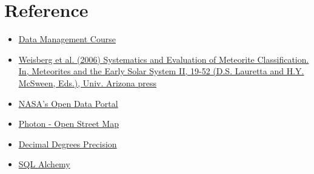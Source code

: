 \documentclass[conference]{IEEEtran}
\begin{document}
	\section{Reference}
	\begin{itemize}
		\item \href{https://www.diag.uniroma1.it/~lenzerin/index.html/?q=node/53}{Data Management Course}
		\item \href{https://web.pdx.edu/~ruzickaa/meteorites/papers/WeisbergEtal2006-classification.pdf}{Weisberg et al. (2006) Systematics and Evaluation of Meteorite Classification. In, Meteorites and the Early Solar System II, 19-52 (D.S. Lauretta and H.Y. McSween, Eds.), Univ. Arizona press}
		\item \href{https://data.nasa.gov/Space-Science/Meteorite-Landings/gh4g-9sfh/about_data}{NASA's Open Data Portal}
		\item \href{https://photon.komoot.io/}{Photon - Open Street Map}
		\item \href{https://en.wikipedia.org/wiki/Decimal_degrees#Precision}{Decimal Degrees Precision}
		\item \href{https://docs.sqlalchemy.org/en/20/}{SQL Alchemy}
	\end{itemize}
\end{document}

